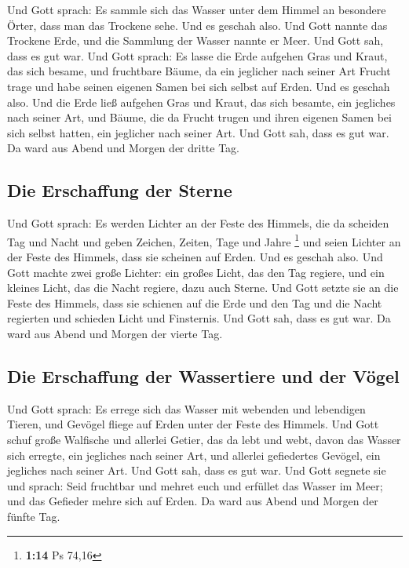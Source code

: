  Und Gott sprach: Es sammle sich das Wasser unter dem
Himmel an besondere Örter, dass man das Trockene sehe. Und es geschah
also.  Und Gott nannte das Trockene Erde, und die
Sammlung der Wasser nannte er Meer. Und Gott sah, dass es gut war.
 Und Gott sprach: Es lasse die Erde aufgehen Gras und
Kraut, das sich besame, und fruchtbare Bäume, da ein jeglicher nach
seiner Art Frucht trage und habe seinen eigenen Samen bei sich selbst
auf Erden. Und es geschah also.  Und die Erde ließ
aufgehen Gras und Kraut, das sich besamte, ein jegliches nach seiner
Art, und Bäume, die da Frucht trugen und ihren eigenen Samen bei sich
selbst hatten, ein jeglicher nach seiner Art. Und Gott sah, dass es gut
war.  Da ward aus Abend und Morgen der dritte Tag.

\hypertarget{die-erschaffung-der-sterne}{%
\subsection{Die Erschaffung der
Sterne}\label{die-erschaffung-der-sterne}}

 Und Gott sprach: Es werden Lichter an der Feste des
Himmels, die da scheiden Tag und Nacht und geben Zeichen, Zeiten, Tage
und Jahre \footnote{\textbf{1:14} Ps 74,16}  und seien
Lichter an der Feste des Himmels, dass sie scheinen auf Erden. Und es
geschah also.  Und Gott machte zwei große Lichter: ein
großes Licht, das den Tag regiere, und ein kleines Licht, das die Nacht
regiere, dazu auch Sterne.  Und Gott setzte sie an die
Feste des Himmels, dass sie schienen auf die Erde  und
den Tag und die Nacht regierten und schieden Licht und Finsternis. Und
Gott sah, dass es gut war.  Da ward aus Abend und Morgen
der vierte Tag.

\hypertarget{die-erschaffung-der-wassertiere-und-der-vuxf6gel}{%
\subsection{Die Erschaffung der Wassertiere und der
Vögel}\label{die-erschaffung-der-wassertiere-und-der-vuxf6gel}}

 Und Gott sprach: Es errege sich das Wasser mit webenden
und lebendigen Tieren, und Gevögel fliege auf Erden unter der Feste des
Himmels.  Und Gott schuf große Walfische und allerlei
Getier, das da lebt und webt, davon das Wasser sich erregte, ein
jegliches nach seiner Art, und allerlei gefiedertes Gevögel, ein
jegliches nach seiner Art. Und Gott sah, dass es gut war.
 Und Gott segnete sie und sprach: Seid fruchtbar und
mehret euch und erfüllet das Wasser im Meer; und das Gefieder mehre sich
auf Erden.  Da ward aus Abend und Morgen der fünfte Tag.

